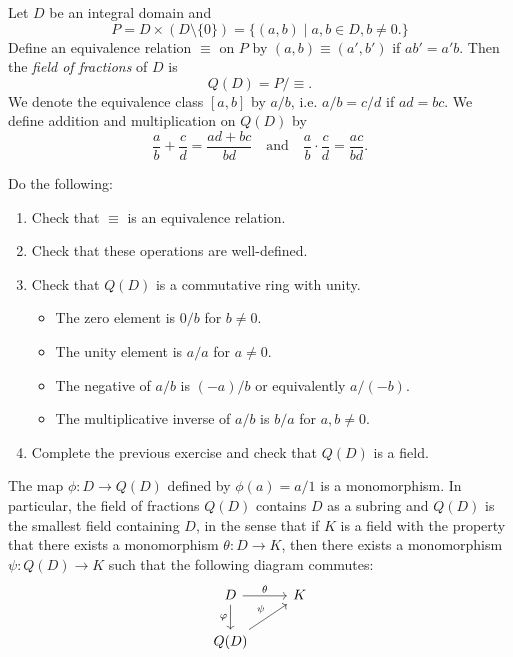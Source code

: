\begin{definition}
  Let $D$ be an integral domain and
  \[P = D \times (D \setminus \{0\})
    = \{(a, b) \mid a, b \in D, b \ne 0.\}
  \]
  Define an equivalence relation $\equiv$ on $P$ by
  $(a, b) \equiv (a', b')$ if $ab' = a'b$. Then
  the \emph{field of fractions} of $D$ is
  \[
    Q(D) = P / {\equiv}.
  \]
  We denote the equivalence class $[a, b]$ by
  $a / b$, i.e. $a / b = c / d$ if $ad = bc$. We
  define addition and multiplication on $Q(D)$ by
\[
  \frac{a}{b} + \frac{c}{d} = \frac{ad + bc}{bd} \quad
  \text{and} \quad
  \frac{a}{b} \cdot \frac{c}{d} = \frac{ac}{bd}.
  \]
\end{definition}

\begin{exercise}
  Do the following:
  \begin{enumerate}
    \item Check that $\equiv$ is an equivalence relation.
    \item Check that these operations are well-defined.
    \item Check that $Q(D)$ is a commutative ring with unity.
      \begin{itemize}
        \item The zero element is $0 / b$ for $b \ne 0$.
        \item The unity element is $a / a$ for $a \ne 0$.
        \item The negative of $a / b$ is $(-a) / b$
          or equivalently $a / (-b)$.
        \item The multiplicative inverse of $a / b$ is
          $b / a$ for $a, b \ne 0$.
      \end{itemize}
    \item Complete the previous exercise and check that
      $Q(D)$ is a field.
  \end{enumerate}
\end{exercise}

\begin{exercise}
  The map $\phi : D \to Q(D)$ defined by
  $\phi(a) = a / 1$ is a monomorphism. In particular,
  the field of fractions
  $Q(D)$ contains $D$ as a subring and $Q(D)$ is
  the smallest field containing $D$, in the sense that
  if $K$ is a field with the property that there exists
  a monomorphism $\theta : D \to K$, then there exists
  a monomorphism $\psi : Q(D) \to K$ such that the
  following diagram commutes:
  \[
    \begin{tikzcd}
      D \arrow{r}{\theta} \arrow[swap]{d}{\varphi}
      & K \\
      Q(D) \arrow{ur}{\psi}
    \end{tikzcd}
  \]
\end{exercise}

